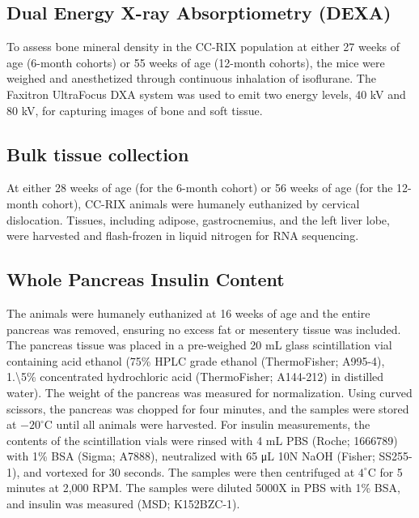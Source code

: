 \documentclass[
]{article}
\begin{document}
\subsection{Dual Energy X-ray Absorptiometry
(DEXA)}\label{dual-energy-x-ray-absorptiometry-dexa}

To assess bone mineral density in the CC-RIX population at either 27
weeks of age (6-month cohorts) or 55 weeks of age (12-month cohorts),
the mice were weighed and anesthetized through continuous inhalation of
isoflurane. The Faxitron UltraFocus DXA system was used to emit two
energy levels, 40 kV and 80 kV, for capturing images of bone and soft
tissue.

\subsection{Bulk tissue collection}\label{bulk-tissue-collection}

At either 28 weeks of age (for the 6-month cohort) or 56 weeks of age
(for the 12-month cohort), CC-RIX animals were humanely euthanized by
cervical dislocation. Tissues, including adipose, gastrocnemius, and the
left liver lobe, were harvested and flash-frozen in liquid nitrogen for
RNA sequencing.

\subsection{Whole Pancreas Insulin
Content}\label{whole-pancreas-insulin-content}

The animals were humanely euthanized at 16 weeks of age and the entire
pancreas was removed, ensuring no excess fat or mesentery tissue was
included. The pancreas tissue was placed in a pre-weighed 20 mL glass
scintillation vial containing acid ethanol (75\% HPLC grade ethanol
(ThermoFisher; A995-4), 1.\textbackslash5\% concentrated hydrochloric
acid (ThermoFisher; A144-212) in distilled water). The weight of the
pancreas was measured for normalization. Using curved scissors, the
pancreas was chopped for four minutes, and the samples were stored at
\(-20^{\circ}\)C until all animals were harvested. For insulin
measurements, the contents of the scintillation vials were rinsed with 4
mL PBS (Roche; 1666789) with 1\% BSA (Sigma; A7888), neutralized with 65
\si{\micro\liter} 10N NaOH (Fisher; SS255-1), and vortexed for 30
seconds. The samples were then centrifuged at \(4^{\circ}\)C for 5
minutes at 2,000 RPM. The samples were diluted 5000X in PBS with 1\%
BSA, and insulin was measured (MSD; K152BZC-1).
\end{document}
